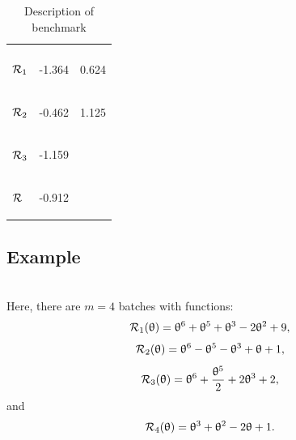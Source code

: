 \documentclass[article,authoryear,jmlmc]{beg_32}             %
\begin{document}
\begin{table}[h!]
	\centering
	\caption{Description of benchmark \exSeven}
	\begin{tabular}{lll}
		
		\begin{bf} \diagbox{Functions}{Minima} \end{bf} & \begin{bf}\mg\end{bf} & \begin{bf}\ml\end{bf} \\
		
		
		\begin{bf}$\mathcal{R}_1$\end{bf} & -1.364 & 0.624  \\ 
		\begin{bf}$\mathcal{R}_2$\end{bf} & -0.462 & 1.125 \\ 
		\begin{bf}$\mathcal{R}_3$\end{bf} & -1.159 &  \\ 
		\begin{bf}$\mathcal{R}$\end{bf}   & -0.912 &   \\ 
	\end{tabular}
	\label{ex7_example}
\end{table}

\subsection{Example \exHeight}
~~\\

Here, there are $m=4$ batches with functions:
\begin{equation*}
	\mathcal{R}_1(\uptheta) = \uptheta^6+\uptheta^5+\uptheta^3-2\uptheta^2+9,
\end{equation*}
\begin{equation*}
	\mathcal{R}_2(\uptheta) = \uptheta^6-\uptheta^5-\uptheta^3+\uptheta+1,
\end{equation*}
\begin{equation*}
	\mathcal{R}_3(\uptheta) = \uptheta^6+\frac{\uptheta^5}{2}+2\uptheta^3+2,
\end{equation*}
and
\begin{equation*}
	\mathcal{R}_4(\uptheta) = \uptheta^3+\uptheta^2-2\uptheta+1.
\end{equation*}
\end{document}
